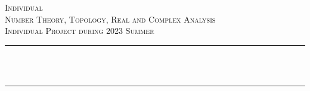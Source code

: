 \begin{titlepage}

  \newcommand{\HRule}{\rule{\linewidth}{0.5mm}} %
  
  
   
  
  \center %
  
  
  \textsc{\LARGE Individual}\\[1.5cm] %
  \textsc{\Large Number Theory, Topology, Real and Complex Analysis}\\[0.5cm] %
  \textsc{\large Individual Project during 2023 Summer}\\[0.5cm] %
  
  \makeatletter
  \HRule \\[0.4cm]
  { \huge \bfseries \@title}\\[0.4cm] %
  \HRule \\[1.5cm]
   
  
  

\end{titlepage}
